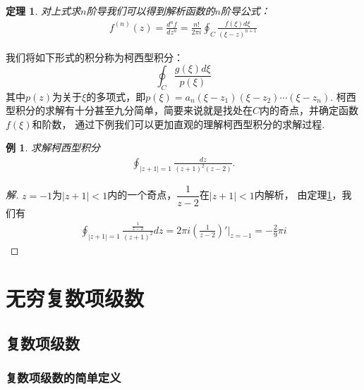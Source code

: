 \documentclass[12pt, a4paper]{ctexbook}
\newtheorem{theorem}{定理}[chapter] %
\newtheorem{example}{例}[chapter] %
\begin{document}
                \begin{theorem}
                    \label{the:analytic_function_derivative}
                    对上式求$n$阶导我们可以得到解析函数的$n$阶导公式：
                    \begin{align*}
                        f^{(n)}(z) = \frac{d^n f}{dz^n} = \frac{n!}{2\pi i}\oint_C \frac{f(\xi)d\xi}{(\xi - z)^{n + 1}}
                    \end{align*}
                \end{theorem}

                我们将如下形式的积分称为柯西型积分：$$\oint_C \frac{g(\xi)d\xi}{p(\xi)}$$
                其中$p(z)$为关于$\xi$的多项式，即$p(\xi) = a_n(\xi - z_1)(\xi - z_2)\cdots(\xi - z_n)$.
                柯西型积分的求解有十分甚至九分简单，简要来说就是找处在$C$内的奇点，并确定函数$f(\xi)$和阶数，
                通过下例我们可以更加直观的理解柯西型积分的求解过程.
                \begin{example}
                    求解柯西型积分
                    \begin{align*}
                        \oint_{|z + 1| = 1}\frac{dz}{(z + 1)^2(z - 2)}.
                    \end{align*}
                \end{example}
                \begin{proof}[解]
                    $z = -1$为$|z + 1| < 1$内的一个奇点，$\dfrac{1}{z - 2}$在$|z + 1| < 1$内解析，
                    由定理\ref{the:analytic_function_derivative}，我们有
                    \begin{align*}
                        \oint_{|z + 1| = 1}\frac{\frac{1}{z - 2}}{(z + 1)^2}dz = 2\pi i\left( \frac{1}{z - 2} \right)'\Bigg|_{z=-1} = -\frac{2}{9}\pi i
                    \end{align*}
                \end{proof}


    \chapter{无穷复数项级数}

        \section{复数项级数}
            \subsection{复数项级数的简单定义}
\end{document}

